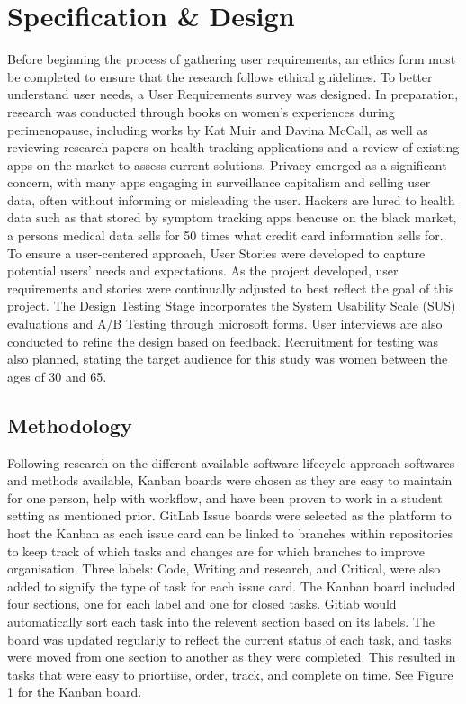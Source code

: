 
\section{Specification \& Design}\label{process}

Before beginning the process of gathering user requirements, an ethics form must be completed to ensure that the research follows ethical guidelines. To better understand user needs, a User Requirements survey was designed. In preparation, research was conducted through books on women’s experiences during perimenopause, including works by Kat Muir\cite{Muir2022} and Davina McCall\cite{McCall2022}, as well as reviewing research papers on health-tracking applications and a review of existing apps on the market to assess current solutions. Privacy emerged as a significant concern, with many apps engaging in surveillance capitalism and selling user data, often without informing or misleading the user\cite{Gilman_2021}\cite{FTC2021}. Hackers are lured to health data such as that stored by symptom tracking apps beacuse on the black market, a persons medical data sells for 50 times what credit card information sells for\cite{Rosato2020}. To ensure a user-centered approach, User Stories were developed to capture potential users’ needs and expectations. As the project developed, user requirements and stories were continually adjusted to best reflect the goal of this project. The Design Testing Stage incorporates the System Usability Scale (SUS) evaluations and A/B Testing through microsoft forms. User interviews are also conducted to refine the design based on feedback. Recruitment for testing was also planned, stating the target audience for this study was women between the ages of 30 and 65.

\subsection{Methodology}
Following research on the different available software lifecycle approach softwares and methods available, Kanban boards were chosen as they are easy to maintain for one person, help with workflow, and have been proven to work in a student setting as mentioned prior. GitLab Issue boards were selected as the platform to host the Kanban as each issue card can be linked to branches within repositories to keep track of which tasks and changes are for which branches to improve organisation. Three labels: Code, Writing and research, and Critical, were also added to signify the type of task for each issue card. The Kanban board included four sections, one for each label and one for closed tasks. Gitlab would automatically sort each task into the relevent section based on its labels. The board was updated regularly to reflect the current status of each task, and tasks were moved from one section to another as they were completed. This resulted in tasks that were easy to priortiise, order, track, and complete on time. See Figure 1 for the Kanban board.

